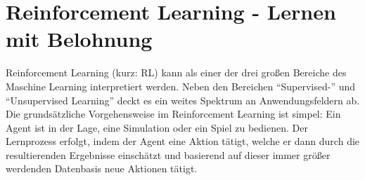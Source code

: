 
\chapter{Reinforcement Learning - Lernen mit Belohnung}
\label{chap:rl}
%

	Reinforcement Learning (kurz: RL) kann als einer der drei großen Bereiche des Maschine Learning interpretiert werden. Neben den Bereichen ``Supervised-'' und ``Unsupervised Learning'' deckt es ein weites Spektrum an Anwendungsfeldern ab.\\
	Die grundsätzliche Vorgehensweise im Reinforcement Learning ist simpel: Ein Agent ist in der Lage, eine Simulation oder ein Spiel zu bedienen. Der Lernprozess erfolgt, indem der Agent eine Aktion tätigt, welche er dann durch die resultierenden Ergebnisse einschätzt und basierend auf dieser immer größer werdenden Datenbasis neue Aktionen tätigt.
	

